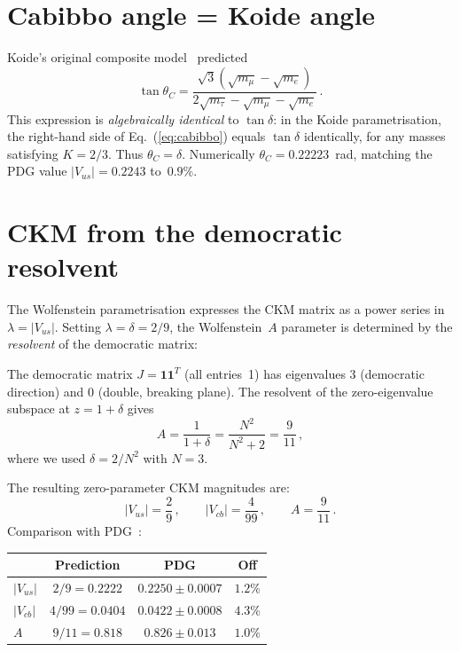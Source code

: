 \documentclass[aps,prl,twocolumn,showpacs,preprintnumbers]{revtex4-2}
\begin{document}
\section{Cabibbo angle = Koide angle}

Koide's original composite model~\cite{Koide:1983} predicted
\begin{equation}
  \tan\theta_C = \frac{\sqrt{3}(\sqrt{m_\mu}-\sqrt{m_e})}{2\sqrt{m_\tau}-\sqrt{m_\mu}-\sqrt{m_e}}\,.
  \label{eq:cabibbo}
\end{equation}
This expression is \emph{algebraically identical} to $\tan\delta$:
in the Koide parametrisation, the right-hand side of
Eq.~(\ref{eq:cabibbo}) equals $\tan\delta$ identically, for any
masses satisfying $K = 2/3$.
Thus $\theta_C = \delta$.
Numerically $\theta_C = 0.22223$~rad, matching the PDG value
$|V_{us}| = 0.2243$ to~$0.9\%$.


\section{CKM from the democratic resolvent}

The Wolfenstein parametrisation expresses the CKM matrix as
a power series in $\lambda = |V_{us}|$.
Setting $\lambda = \delta = 2/9$, the Wolfenstein~$A$ parameter
is determined by the \emph{resolvent} of the democratic matrix:

The democratic matrix $J = \mathbf{1}\mathbf{1}^T$ (all entries~1)
has eigenvalues $3$ (democratic direction) and $0$ (double,
breaking plane).
The resolvent of the zero-eigenvalue subspace at
$z = 1 + \delta$ gives
\begin{equation}
  A = \frac{1}{1+\delta} = \frac{N^2}{N^2+2} = \frac{9}{11}\,,
  \label{eq:A}
\end{equation}
where we used $\delta = 2/N^2$ with $N = 3$.

The resulting zero-parameter CKM magnitudes are:
\begin{equation}
  |V_{us}| = \frac{2}{9}\,,\qquad
  |V_{cb}| = \frac{4}{99}\,,\qquad
  A = \frac{9}{11}\,.
  \label{eq:ckm}
\end{equation}
Comparison with PDG~\cite{PDG:2024}:

\begin{center}
\begin{tabular}{lccc}
\hline
& Prediction & PDG & Off \\
\hline
$|V_{us}|$ & $2/9 = 0.2222$ & $0.2250 \pm 0.0007$ & $1.2\%$ \\
$|V_{cb}|$ & $4/99 = 0.0404$ & $0.0422 \pm 0.0008$ & $4.3\%$\footnotemark \\
$A$ & $9/11 = 0.818$ & $0.826 \pm 0.013$ & $1.0\%$ \\
\hline
\end{tabular}
\end{center}
\end{document}
